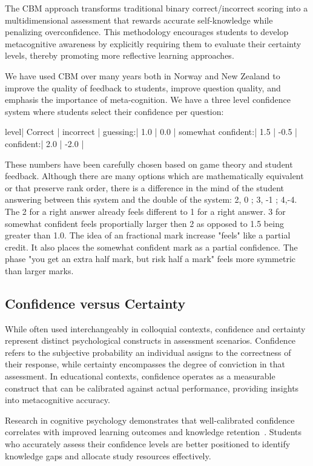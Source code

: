 \documentclass[sigconf]{acmart}
\begin{document}
The CBM approach transforms traditional binary correct/incorrect scoring into a multidimensional assessment that rewards accurate self-knowledge while penalizing overconfidence. This methodology encourages students to develop metacognitive awareness by explicitly requiring them to evaluate their certainty levels, thereby promoting more reflective learning approaches.

We have used CBM over many years both in Norway and New Zealand to improve the quality of feedback to students, improve question quality, and emphasis the importance of meta-cognition. We have a three level confidence system where students select their confidence per question:
\begin{tabular}
  level| Correct | incorrect |
  guessing:| 1.0 | 0.0 |
  somewhat confident:| 1.5 | -0.5 |
  confident:| 2.0 | -2.0 |
\end{tabular}

These numbers have been carefully chosen based on game theory and student feedback.  Although there are many options which are mathematically equivalent or that preserve rank order, there is a difference in the mind of the student answering between this system and the double of the system: 2, 0 ; 3, -1 ; 4,-4.  The 2 for a right answer already feels different to 1 for a right answer.  3 for somewhat confident feels proportially larger then 2 as opposed to 1.5 being greater than 1.0.  The idea of an fractional mark increase "feels" like a partial credit.  It also places the somewhat confident mark as a partial confidence.  The phase "you get an extra half mark, but risk half a mark" feels more symmetric than larger marks.


\subsection{Confidence versus Certainty}

While often used interchangeably in colloquial contexts, confidence and certainty represent distinct psychological constructs in assessment scenarios. Confidence refers to the subjective probability an individual assigns to the correctness of their response, while certainty encompasses the degree of conviction in that assessment. In educational contexts, confidence operates as a measurable construct that can be calibrated against actual performance, providing insights into metacognitive accuracy.

Research in cognitive psychology demonstrates that well-calibrated confidence correlates with improved learning outcomes and knowledge retention~\cite{dunlosky2011four}. Students who accurately assess their confidence levels are better positioned to identify knowledge gaps and allocate study resources effectively.
\end{document}
